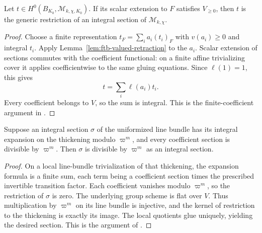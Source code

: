 \begin{srlemma}
\label{lem:ftb-coefficient-descent}
Let \(t\in H^0(B_{K_0},\mathcal M_{k,\chi,K_0})\).
If its scalar extension to \(F\) satisfies \(V_{\ge0}\), then \(t\)
is the generic restriction of an integral section of
\(\mathcal M_{k,\chi}\).
\end{srlemma}
\begin{proof}
Choose a finite representation
\(t_F=\sum_i a_i(t_i)_F\) with \(v(a_i)\ge0\) and integral \(t_i\).
Apply Lemma~\ref{lem:ftb-valued-retraction} to the \(a_i\).
Scalar extension of sections commutes with the coefficient functional:
on a finite affine trivializing cover it applies coefficientwise to
the same gluing equations.  Since \(\ell(1)=1\), this gives
\[
                        t=\sum_i\ell(a_i)t_i .
\]
Every coefficient belongs to \(V\), so the sum is integral.
This is the finite-coefficient argument in
.
\end{proof}

\begin{srlemma}
\label{lem:ftb-expansion-divisibility}
Suppose an integral section \(\sigma\) of the uniformized line bundle
has its integral expansion on the thickening modulo \(\varpi^m\),
and every coefficient section is divisible by \(\varpi^m\).
Then \(\sigma\) is divisible by \(\varpi^m\) as an integral section.
\end{srlemma}
\begin{proof}
On a local line-bundle trivialization of that thickening, the expansion
formula is a finite sum, each term being a coefficient section times
the prescribed invertible transition factor.  Each coefficient
vanishes modulo \(\varpi^m\), so the restriction of \(\sigma\) is zero.
The underlying group scheme is flat over \(V\).  Thus multiplication
by \(\varpi^m\) on its line bundle is injective, and the kernel of
restriction to the thickening is exactly its image.
The local quotients glue uniquely, yielding the desired section.
This is the argument of
.
\end{proof}


